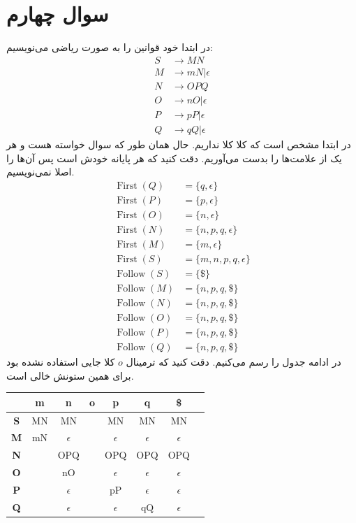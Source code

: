 \documentclass[]{article}
\begin{document}
\section*{سوال چهارم}
در ابتدا خود قوانین را به صورت ریاضی می‌نویسیم:
\begin{align*}
    S &\rightarrow MN\\
    M &\rightarrow mN | \epsilon\\
    N &\rightarrow OPQ\\
    O &\rightarrow nO | \epsilon\\
    P &\rightarrow pP | \epsilon\\
    Q &\rightarrow qQ | \epsilon
\end{align*}
در ابتدا مشخص است که کلا
کلا نداریم. حال همان طور که سوال خواسته هست
 و 
هر یک از علامت‌ها را بدست می‌آوریم. دقت کنید که
هر پایانه خودش است پس آن‌ها را اصلا نمی‌نویسیم.
\begin{align*}
    \operatorname{First}(Q) &= \{q, \epsilon\}\\
    \operatorname{First}(P) &= \{p, \epsilon\}\\
    \operatorname{First}(O) &= \{n, \epsilon\}\\
    \operatorname{First}(N) &= \{n, p, q, \epsilon\}\\
    \operatorname{First}(M) &= \{m, \epsilon\}\\
    \operatorname{First}(S) &= \{m, n, p, q, \epsilon\}\\
    \operatorname{Follow}(S) &= \{\$\}\\
    \operatorname{Follow}(M) &= \{n, p, q, \$\}\\
    \operatorname{Follow}(N) &= \{n, p, q, \$\}\\
    \operatorname{Follow}(O) &= \{n, p, q, \$\}\\
    \operatorname{Follow}(P) &= \{n, p, q, \$\}\\
    \operatorname{Follow}(Q) &= \{n, p, q, \$\}
\end{align*}
در ادامه جدول
را رسم می‌کنیم. دقت کنید که ترمینال
$o$
کلا جایی استفاده نشده بود برای همین ستونش خالی است.
\begin{latin}
    \centering
    \begin{tabular}{|c|c|c|c|c|c|c|c|}
        \hline
        & \textbf{m} & \textbf{n} & \textbf{o} & \textbf{p} & \textbf{q} & \textbf{\$}\\
        \hline
        \textbf{S} & MN & MN && MN & MN & MN\\
        \hline
        \textbf{M} & mN & $\epsilon$ &&$\epsilon$&$\epsilon$&$\epsilon$\\
        \hline
        \textbf{N} &&OPQ&&OPQ&OPQ&OPQ\\
        \hline
        \textbf{O} &&nO&&$\epsilon$&$\epsilon$&$\epsilon$\\
        \hline
        \textbf{P} &&$\epsilon$&&pP&$\epsilon$&$\epsilon$\\
        \hline
        \textbf{Q} &&$\epsilon$&&$\epsilon$&qQ&$\epsilon$\\
        \hline
    \end{tabular}
\end{latin}
\end{document}
